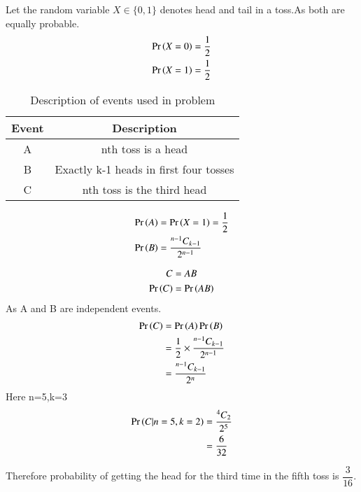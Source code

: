 Let the random variable $X \in \{0,1\}$ denotes head and tail in a toss.As both are equally probable.
\begin{align}
    \Pr\left(X=0\right)=\dfrac{1}{2}\\
    \Pr\left(X=1\right)=\dfrac{1}{2}
\end{align}

\begin{table}[h]
\begin{tabular}{|c|c|}
\hline
\textbf{Event} & \textbf{Description}                 \\ \hline
A              & nth toss is a head                   \\ \hline
B              & Exactly k-1 heads in first four tosses \\ \hline
C              & nth toss is the third head           \\ \hline
\end{tabular}
\caption{Description of events used in problem}
\label{tab:Events}
\end{table}

\begin{align}
\Pr\left(A\right)&=\Pr\left(X=1\right)=\dfrac{1}{2}\\
\Pr\left(B\right)&=\dfrac{{}^{n-1}C_{k-1}}{2^{n-1}}
\end{align}

\begin{align}
    C&=AB\\
    \Pr\left(C\right)&=\Pr\left(AB\right)
\end{align}
As A and B are independent events.
\begin{align}
    \Pr\left(C\right)&=\Pr\left(A\right)\Pr\left(B\right)\\
    &=\dfrac{1}{2}\times\dfrac{{}^{n-1}C_{k-1}}{2^{n-1}}\\
    &=\dfrac{{}^{n-1}C_{k-1}}{2^n}
\end{align}
Here n=5,k=3
\begin{align}
    \Pr\left(C|n=5,k=2\right)&=\dfrac{{}^{4}C_{2}}{2^{5}}\\
    &=\dfrac{6}{32}
\end{align}

Therefore probability of getting the head for the third time in the fifth toss is $\dfrac{3}{16}$. 
